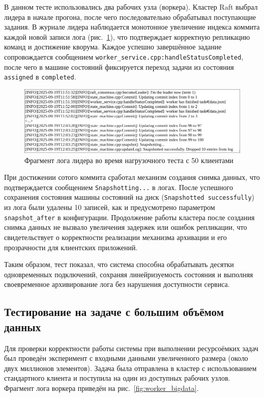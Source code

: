 В данном тесте использовались два рабочих узла (воркера). Кластер Raft выбрал
лидера в начале прогона, после чего последовательно обрабатывал поступающие
задания. В журнале лидера наблюдается монотонное увеличение индекса коммита
каждой новой записи лога (рис.~\ref{fig:leader_log_50}), что подтверждает
корректную репликацию команд и достижение кворума. Каждое успешно завершённое
задание сопровождается сообщением
\texttt{worker\_service.cpp:handleStatusCompleted}, после чего в машине
состояний фиксируется переход задачи из состояния \texttt{assigned} в
\texttt{completed}.

\begin{figure}[h!]
    \centering
    \includegraphics[width=0.95\linewidth]{inc/leader-multi-conn.png}
    \caption{Фрагмент лога лидера во время нагрузочного теста с 50 клиентами}
    \label{fig:leader_log_50}
\end{figure}

При достижении сотого коммита сработал механизм создания снимка данных, что
подтверждается сообщением \texttt{Snapshotting...} в логах. После успешного
сохранения состояния машины состояний на диск (\texttt{Snapshotted
successfully}) из лога были удалены 10 записей, как и предусмотрено параметром
\texttt{snapshot\_after} в конфигурации. Продолжение работы кластера после
создания снимка данных не вызвало увеличения задержек или ошибок репликации, что
свидетельствует о корректности реализации механизма архивации и его
прозрачности для клиентских приложений.

Таким образом, тест показал, что система способна обрабатывать десятки
одновременных подключений, сохраняя линейризуемость состояния и выполняя
своевременное архивирование лога без нарушения доступности сервиса.

\subsection{Тестирование на задаче с большим объёмом данных}

Для проверки корректности работы системы при выполнении ресурсоёмких задач был
проведён эксперимент с входными данными увеличенного размера (около двух
миллионов элементов). Задача была отправлена в кластер с использованием
стандартного клиента и поступила на один из доступных рабочих узлов. Фрагмент
лога воркера приведён на рис.~\ref{fig:worker_bigdata}.

